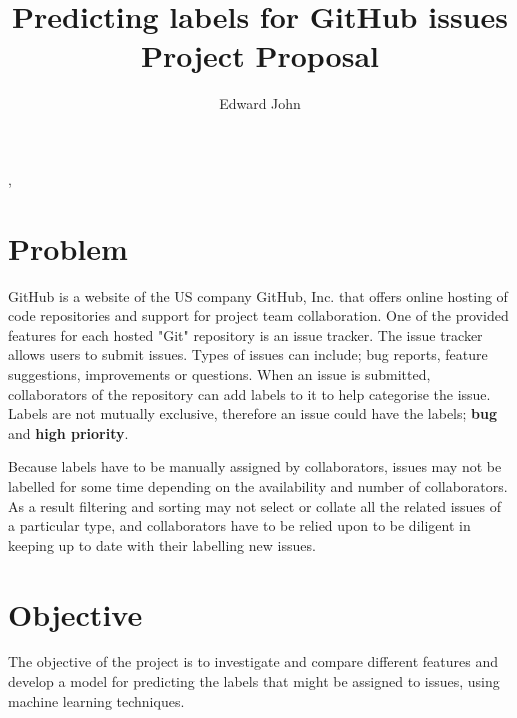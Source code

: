 \documentclass{article}
\title{Predicting labels for GitHub issues \\ Project Proposal}
\author{Edward John}
\begin{document}
\newcommand{\mycite}[1]{\textsuperscript{\cite{#1}}}

\begin{Large}
\noindent
\makeatletter
\@title \par
\makeatother
\end{Large}
\vspace{1em}
\begin{large}
\noindent
\makeatletter
\@author, \@date
\makeatother
\end{large}

\begin{multicols}{2}
\section*{Problem}
GitHub is a website of the US company GitHub, Inc. that offers online hosting of code repositories and support for project team collaboration. One of the provided features for each hosted "Git" repository is an issue tracker. The issue tracker allows users to submit issues. Types of issues can include; bug reports, feature suggestions, improvements or questions. When an issue is submitted, collaborators of the repository can add labels to it to help categorise the issue. Labels are not mutually exclusive, therefore an issue could have the labels; \textbf{bug} and \textbf{high priority}.

Because labels have to be manually assigned by collaborators, issues may not be labelled for some time depending on the availability and number of collaborators. As a result filtering and sorting may not select or collate all the related issues of a particular type, and collaborators have to be relied upon to be diligent in keeping up to date with their labelling new issues.

\section*{Objective}
The objective of the project is to investigate and compare different features and develop a model for predicting the labels that might be assigned to issues, using machine learning techniques.


\end{multicols}
\end{document}
